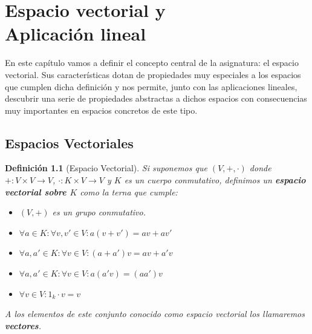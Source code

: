 \documentclass[10pt,a4paper,openright]{book}
\theoremstyle{break}
\newtheorem*{defi}{Definición}
\begin{document}
\chapter{Espacio vectorial y \\ Aplicación lineal}
En este capítulo vamos a definir el concepto central de la asignatura: el espacio vectorial. Sus características dotan de propiedades muy especiales a los espacios que cumplen dicha definición y nos permite, junto con las aplicaciones lineales, descubrir una serie de propiedades abstractas a dichos espacios con consecuencias muy importantes en espacios concretos de este tipo.

\section{Espacios Vectoriales}
\begin{defi}[Espacio Vectorial]
Si suponemos que $(V,+,\cdot)$ donde $+: V\times V\rightarrow V$, $\cdot : K\times V\rightarrow V$ y $K$ es un cuerpo conmutativo, definimos un \textbf{espacio vectorial sobre $K$} como la terna que cumple:
\begin{itemize}
\item $(V,+)$ es un grupo conmutativo.

\item $\forall a \in K: \forall v,v'\in V: a(v+v')=av+av'$

\item $\forall a,a' \in K: \forall v\in V: (a+a')v=av+a'v$

\item $\forall a,a'\in K: \forall v \in V: a(a'v)=(aa')v$

\item $\forall v\in V: 1_k\cdot v=v$
\end{itemize}
A los elementos de este conjunto conocido como espacio vectorial los llamaremos \textbf{vectores}.
\end{defi}
\end{document}

